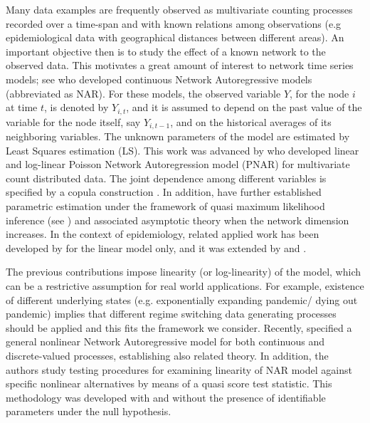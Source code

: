 Many data examples   are frequently observed as  multivariate   counting processes recorded over a time-span and with known relations among  observations (e.g epidemiological data with geographical distances between different areas). 
An important  objective   then  is to study  the effect of a  known network to the observed data. 
This  motivates a great amount of  interest to  network  time series models; see 
\cite{zhu2017}  who developed continuous  Network Autoregressive models (abbreviated as NAR). 
For these models,  the observed  variable $Y$, for the node $i$ at time $t$, is denoted by $Y_{i,t}$, and it is assumed to depend   on the past value of the variable for the node itself,  say $Y_{i,t-1}$, 
and on the historical averages of its neighboring variables. The unknown parameters of the model are estimated by Least Squares estimation (LS). This work was advanced  by 
\cite{armillotta_fokianos_2021} who developed  linear and  
log-linear Poisson Network Autoregression model (PNAR) for multivariate count  distributed data. 
The joint dependence among different variables is specified by a copula construction \cite[Sec.~2]{fok2020}. In addition,  
\cite{armillotta_fokianos_2021} have further established 
parametric estimation under the framework of quasi maximum likelihood inference (see \cite{wedderburn1974quasi}  \cite{gourieroux1984pseudo}) and associated asymptotic theory when the network dimension increases. In the context of epidemiology,  
related applied work has been developed  by \cite{held_etal_2005} for the linear model only,  and it was  extended by \cite{paul_etal_2008,paul_etal_2011,held_etal_2012,Meyer_etal_2014} and \cite{bracher_2020endemic}.



The previous contributions impose  linearity (or log-linearity) of the model,
which can be  a restrictive assumption for real world applications.  For example, 
existence of different underlying states  (e.g. exponentially expanding pandemic/ dying out pandemic)  implies that  different regime switching data generating processes should  be applied  and this fits the framework
we consider. Recently,  \cite{armillotta_fokianos_2022_testing} specified a general nonlinear Network Autoregressive model for both continuous and discrete-valued processes, establishing also related theory. In addition, the authors study  testing procedures for examining linearity of NAR model against specific nonlinear alternatives by means of a quasi score test statistic.
This methodology was developed  with and without the presence of  identifiable parameters under the null hypothesis.


